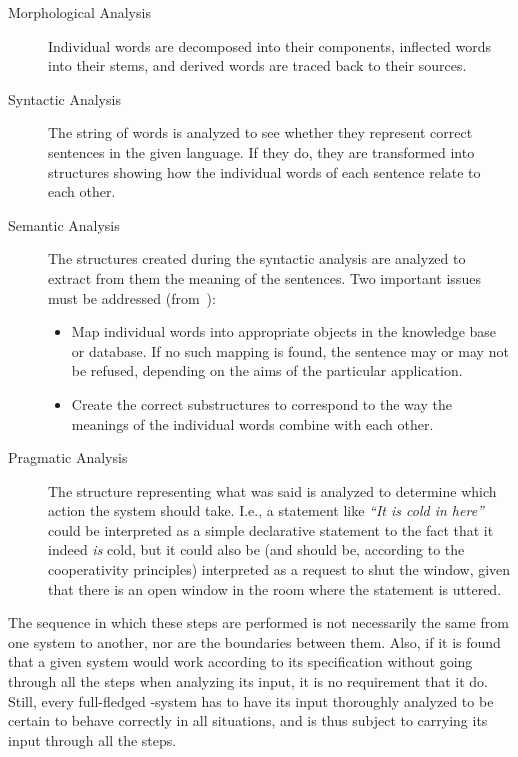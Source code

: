 \begin{description}
\item[Morphological Analysis] \begin{sloppypar} Individual words are
  decomposed into their components, inflected words into their stems,
  and derived words are traced back to their sources. \end{sloppypar}
  \item[Syntactic Analysis] The string of words is analyzed to see
    whether they represent correct sentences in the given language. If
    they do, they are transformed into structures showing how the
    individual words of each sentence relate to each other.
  \item[Semantic Analysis] The structures created during the
    syntactic analysis are analyzed to extract from them the meaning
    of the sentences. Two important issues must be addressed
    (from~\cite{rich}):

    \begin{itemize}
      \item Map individual words into appropriate objects in the
        knowledge base or database. If no such mapping is found, the
        sentence may or may not be refused, depending on the aims of
        the particular application.
      \item Create the correct substructures to correspond to the way
        the meanings of the individual words combine with each other.
    \end{itemize}
    
  \item[Pragmatic Analysis] The structure representing what was
    said is analyzed to determine which action the system should take.
    I.e., a statement like {\em ``It is cold in here''\/} could be
    interpreted as a simple declarative statement to the fact that it
    indeed {\em is\/} cold, but it could also be (and should be,
    according to the cooperativity principles) interpreted as a
    request to shut the window, given that there is an open window in
    the room where the statement is uttered.
\end{description}

The sequence in which these steps are performed is not necessarily the
same from one system to another, nor are the boundaries between them.
Also, if it is found that a given system would work according to its
specification without going through all the steps when analyzing its
input, it is no requirement that it do. Still, every full-fledged
{\nlp}-system has to have its input thoroughly analyzed to be certain
to behave correctly in all situations, and is thus subject to carrying
its input through all the steps.

